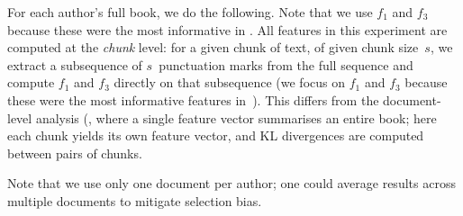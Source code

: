 \documentclass{article}
\begin{document}
For each author's full book, we do the following. Note that we use $f_1$ and $f_3$ because these were the most informative in \cite{punctuation_2021}. 
All features in this experiment are computed at the \emph{chunk} level: for a given chunk of text, of given chunk size~$s$, we extract a subsequence of $s$~punctuation marks from the full sequence and compute $f_1$ and $f_3$ directly on that subsequence (we focus on $f_1$ and $f_3$ because these were the most informative features in~\cite{punctuation_2021}).
This differs from the document-level analysis (\cite{punctuation_2021}, where a single feature vector summarises an entire book; here each chunk yields its own feature vector, and KL divergences are computed between pairs of chunks.

Note that we use only one document per author; one could average results across multiple documents to mitigate selection bias.
\end{document}
